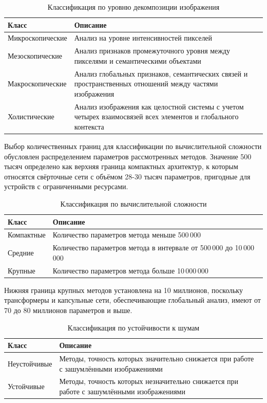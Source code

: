 \begin{table}[H]
	\centering
	\caption{Классификация по уровню декомпозиции изображения}
	\label{tab:analysis-level-classification}
	\begin{tabularx}{\textwidth}{|>{\centering\arraybackslash}p{4cm}|Y|}
		\hline
		\textbf{Класс} & \textbf{Описание} \\
		\hline
		Микроскопические & Анализ на уровне интенсивностей пикселей \\
		\hline
		Мезоскопические & Анализ признаков промежуточного уровня между пикселями и семантическими объектами \\
		\hline
		Макроскопические & Анализ глобальных признаков, семантических связей и пространственных отношений между частями изображения \\
		\hline
		Холистические & Анализ изображения как целостной системы с учетом четырех взаимосвязей всех элементов и глобального контекста \\
		\hline
	\end{tabularx}
\end{table}

Выбор количественных границ для классификации по вычислительной сложности обусловлен распределением параметров рассмотренных методов. Значение 500 тысяч определено как верхняя граница компактных архитектур, к которым относятся свёрточные сети с объёмом 28-30 тысяч параметров, пригодные для устройств с ограниченными ресурсами. 
\begin{table}[h]
	\centering
	\caption{Классификация по вычислительной сложности}
	\label{tab:complexity-classification}
	\begin{tabularx}{\textwidth}{|>{\centering\arraybackslash}p{4cm}|Y|}
		\hline
		\textbf{Класс} & \textbf{Описание} \\
		\hline
		Компактные & Количество параметров метода меньше 500\,000 \\
		\hline
		Средние & Количество параметров метода в интервале от 500\,000 до 10\,000\,000\\
		\hline
		Крупные &  Количество параметров метода больше 10\,000\,000 \\
		\hline
	\end{tabularx}
\end{table}
Нижняя граница крупных методов установлена на 10 миллионов, поскольку трансформеры и капсульные сети, обеспечивающие глобальный анализ, имеют от 70 до 80 миллионов параметров и выше.

\begin{table}[H]
	\centering
	\caption{Классификация по устойчивости к шумам}
	\label{tab:noise-resistance-classification}
	\begin{tabularx}{\textwidth}{|>{\centering\arraybackslash}p{4cm}|Y|}
		\hline
		\textbf{Класс} & \textbf{Описание} \\
		\hline
		Неустойчивые & Методы, точность которых значительно снижается при работе с зашумлёнными изображениями \\
		\hline
		Устойчивые & Методы, точность которых незначительно снижается при работе с зашумлёнными изображениями \\
		\hline
	\end{tabularx}
\end{table}


